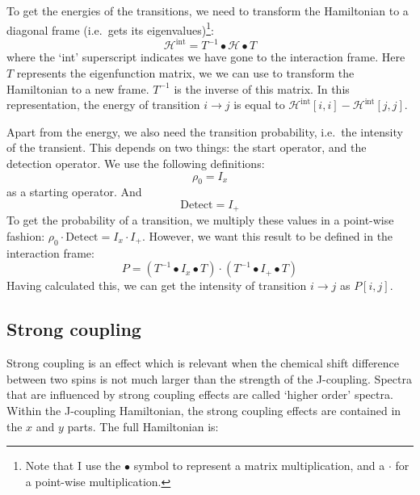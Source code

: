 \documentclass[11pt,a4paper]{article}
\begin{document}
To get the energies of the transitions, we need to transform the Hamiltonian to a diagonal
frame (i.e.\ gets its eigenvalues)\footnote{Note that I
use the $\bullet$ symbol to represent a matrix multiplication, and a $\cdot$ for a
point-wise multiplication.}:
\begin{equation}
  \mathcal{H}^\text{int} = T^{-1} \bullet \mathcal{H}\bullet T
\end{equation}
where the `int' superscript indicates we have gone to the interaction frame.  Here $T$
represents the eigenfunction matrix, we we can use to transform the Hamiltonian to a new
frame. $T^{-1}$ is the inverse of this matrix. In this representation, the energy of
transition $i \rightarrow j$ is equal to $\mathcal{H}^\text{int}[i,i] -
\mathcal{H}^\text{int}[j,j]$.

Apart from the energy, we also need the transition probability, i.e.\ the intensity of the
transient. This depends on two things: the start operator, and the detection operator. We
use the following definitions:
\begin{equation}
  \rho_0 = I_x
\end{equation}
as a starting operator. And
\begin{equation}
  \text{Detect} = I_+
\end{equation}
To get the probability of a transition, we multiply these values in a point-wise fashion:
$\rho_0 \cdot \text{Detect} = I_x  \cdot I_+$. However, we want this result to be defined
in the interaction frame:
\begin{equation}
  P = (T^{-1} \bullet I_x \bullet T) \cdot (T^{-1} \bullet I_+\bullet T)
\end{equation}
Having calculated this, we can get the intensity of transition $i \rightarrow j$ as $P[i,j]$.

\subsection{Strong coupling}
Strong coupling is an effect which is relevant when the chemical shift
difference between two spins is not much larger than the strength of the
J-coupling. Spectra that are influenced by strong coupling effects are called
`higher order' spectra. Within the J-coupling Hamiltonian, the strong coupling
effects are contained in the $x$ and $y$ parts. The full Hamiltonian is:
\end{document}
